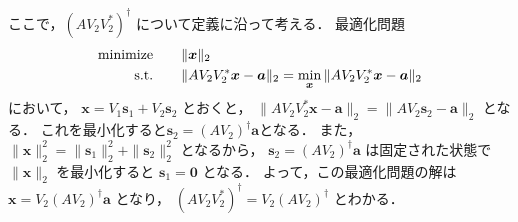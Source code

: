 ここで，$(AV_2V_2^*)^\dagger$ について定義に沿って考える．
最適化問題
\begin{align}
    \text{minimize} \hspace{2em} & \|\bm{x}\|_2 \notag                                                                    \\
    \text{s.t.} \hspace{2em}     & \|AV_2V_2^* \bm{x} - \bm{a}\|_2 = \min_{\bm{x}} \|AV_2V_2^* \bm{x} - \bm{a}\|_2 \notag
\end{align}
において，
$\bm{x} = V_1 \bm{s}_1 + V_2 \bm{s}_2$
とおくと，
$\|A V_2 V_2^* \bm{x} - \bm{a}\|_2 = \|A V_2 \bm{s}_2 - \bm{a}\|_2$
となる．
これを最小化すると$\bm{s}_2=(AV_2)^\dagger\bm{a}$となる．
また，
$\|\bm{x}\|_2^2 = \|\bm{s}_1\|_2^2 + \|\bm{s}_2\|_2^2$
となるから，
$\bm{s}_2 = (A V_2)^\dagger \bm{a}$
は固定された状態で
$\|\bm{x}\|_2$
を最小化すると
$\bm{s}_1=\bm{0}$
となる．
よって，この最適化問題の解は
$\bm{x} = V_2 (A V_2)^\dagger \bm{a}$
となり，
$(A V_2 V_2^*)^\dagger = V_2 (A V_2)^\dagger$
とわかる．


